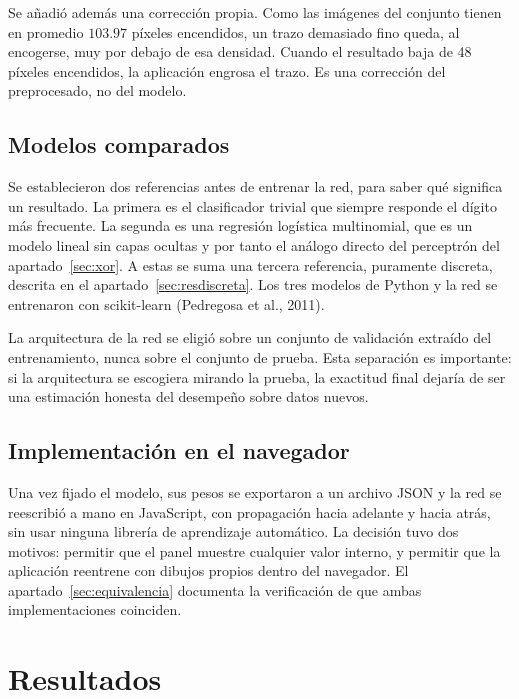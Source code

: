 \documentclass[12pt,letterpaper]{article}
\begin{document}
Se añadió además una corrección propia. Como las imágenes del conjunto tienen en
promedio $103.97$ píxeles encendidos, un trazo demasiado fino queda, al encogerse,
muy por debajo de esa densidad. Cuando el resultado baja de 48 píxeles encendidos,
la aplicación engrosa el trazo. Es una corrección del preprocesado, no del modelo.

\subsection{Modelos comparados}
\label{sec:modelos}

Se establecieron dos referencias antes de entrenar la red, para saber qué significa
un resultado. La primera es el clasificador trivial que siempre responde el dígito
más frecuente. La segunda es una regresión logística multinomial, que es un modelo
lineal sin capas ocultas y por tanto el análogo directo del perceptrón del
apartado~\ref{sec:xor}. A estas se suma una tercera referencia, puramente discreta,
descrita en el apartado~\ref{sec:resdiscreta}. Los tres modelos de Python y la red
se entrenaron con scikit-learn (Pedregosa et al., 2011).

La arquitectura de la red se eligió sobre un conjunto de validación extraído del
entrenamiento, nunca sobre el conjunto de prueba. Esta separación es importante: si
la arquitectura se escogiera mirando la prueba, la exactitud final dejaría de ser
una estimación honesta del desempeño sobre datos nuevos.

\subsection{Implementación en el navegador}

Una vez fijado el modelo, sus pesos se exportaron a un archivo JSON y la red se
reescribió a mano en JavaScript, con propagación hacia adelante y hacia atrás, sin
usar ninguna librería de aprendizaje automático. La decisión tuvo dos motivos:
permitir que el panel muestre cualquier valor interno, y permitir que la aplicación
reentrene con dibujos propios dentro del navegador. El
apartado~\ref{sec:equivalencia} documenta la verificación de que ambas
implementaciones coinciden.

\section{Resultados}
\end{document}
